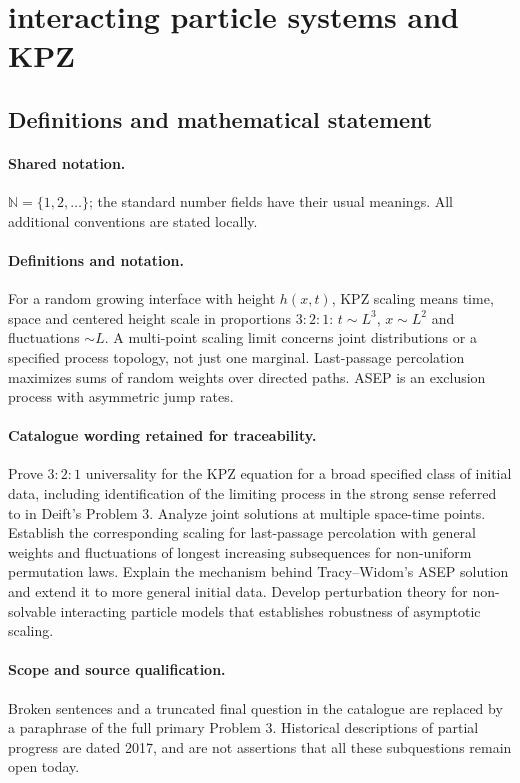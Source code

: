 \documentclass[11pt]{article}
\begin{document}
\section{interacting particle systems and KPZ}\label{statement}

\subsection{Definitions and mathematical statement}

\paragraph{Shared notation.}$\mathbb N=\{1,2,\ldots\}$; the standard number fields have their usual meanings. All additional conventions are stated locally.


\paragraph{Definitions and notation.}For a random growing interface with height $h(x,t)$, KPZ scaling means time, space and centered height scale in proportions $3:2:1$: $t\sim L^3$, $x\sim L^2$ and fluctuations $\sim L$. A multi-point scaling limit concerns joint distributions or a specified process topology, not just one marginal. Last-passage percolation maximizes sums of random weights over directed paths. ASEP is an exclusion process with asymmetric jump rates.

\paragraph{Catalogue wording retained for traceability.}
Prove $3:2:1$ universality for the KPZ equation for a broad specified class of initial data, including identification of the limiting process in the strong sense referred to in Deift’s Problem 3. Analyze joint solutions at multiple space-time points. Establish the corresponding scaling for last-passage percolation with general weights and fluctuations of longest increasing subsequences for non-uniform permutation laws. Explain the mechanism behind Tracy--Widom’s ASEP solution and extend it to more general initial data. Develop perturbation theory for non-solvable interacting particle models that establishes robustness of asymptotic scaling.
\paragraph{Scope and source qualification.}Broken sentences and a truncated final question in the catalogue are replaced by a paraphrase of the full primary Problem 3. Historical descriptions of partial progress are dated 2017, and are not assertions that all these subquestions remain open today.
\end{document}
